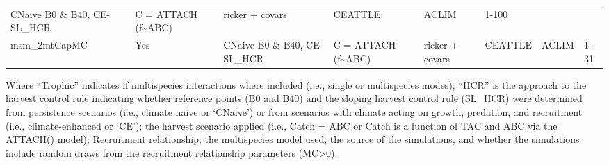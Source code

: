 \documentclass[]{article}
\begin{document}
\begin{longtable}[]{@{}llllllll@{}}
\begin{minipage}[t]{0.13\columnwidth}
CNaive B0 \& B40, CE-SL\_HCR\strut
\end{minipage} & \begin{minipage}[t]{0.10\columnwidth}\raggedright\strut
C = ATTACH (f\textasciitilde{}ABC)\strut
\end{minipage} & \begin{minipage}[t]{0.11\columnwidth}\raggedright\strut
ricker + covars\strut
\end{minipage} & \begin{minipage}[t]{0.10\columnwidth}\raggedright\strut
CEATTLE\strut
\end{minipage} & \begin{minipage}[t]{0.08\columnwidth}\raggedright\strut
ACLIM\strut
\end{minipage} & \begin{minipage}[t]{0.05\columnwidth}\raggedright\strut
1-100\strut
\end{minipage}\tabularnewline
\begin{minipage}[t]{0.16\columnwidth}\raggedright\strut
msm\_2mtCapMC\strut
\end{minipage} & \begin{minipage}[t]{0.06\columnwidth}\raggedright\strut
Yes\strut
\end{minipage} & \begin{minipage}[t]{0.13\columnwidth}\raggedright\strut
CNaive B0 \& B40, CE-SL\_HCR\strut
\end{minipage} & \begin{minipage}[t]{0.10\columnwidth}\raggedright\strut
C = ATTACH (f\textasciitilde{}ABC)\strut
\end{minipage} & \begin{minipage}[t]{0.11\columnwidth}\raggedright\strut
ricker + covars\strut
\end{minipage} & \begin{minipage}[t]{0.10\columnwidth}\raggedright\strut
CEATTLE\strut
\end{minipage} & \begin{minipage}[t]{0.08\columnwidth}\raggedright\strut
ACLIM\strut
\end{minipage} & \begin{minipage}[t]{0.05\columnwidth}\raggedright\strut
1-31\strut
\end{minipage}\tabularnewline
\bottomrule
\end{longtable}

Where ``Trophic'' indicates if multispecies interactions where included
(i.e., single or multispecies modes); ``HCR'' is the approach to the
harvest control rule indicating whether reference points (B0 and B40)
and the sloping harvest control rule (SL\_HCR) were determined from
persistence scenarios (i.e., climate naive or `CNaive') or from
scenarios with climate acting on growth, predation, and recruitment
(i.e., climate-enhanced or `CE'); the harvest scenario applied (i.e.,
Catch = ABC or Catch is a function of TAC and ABC via the ATTACH()
model); Recruitment relationship; the multispecies model used, the
source of the simulations, and whether the simulations include random
draws from the recruitment relationship parameters (MC\textgreater{}0).
\end{document}
